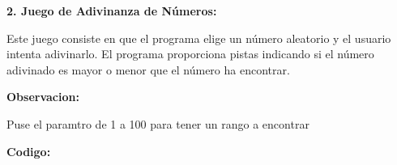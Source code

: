 \documentclass[a4paper]{article}
\begin{document}
\bigskip


\bigskip


\bigskip


\bigskip


\bigskip


\bigskip


\bigskip


\bigskip


\bigskip


\bigskip


\bigskip


\bigskip

{
\textbf{2. Juego de Adivinanza de Números:}}

{
Este juego consiste en que el programa elige un número aleatorio y el usuario intenta adivinarlo. El programa
proporciona pistas indicando si el número adivinado es mayor o menor que el número ha encontrar.}

{
\textbf{Observacion: }}

{
Puse el paramtro de 1 a 100 para tener un rango a encontrar}

{
\textbf{Codigo:}}


\bigskip


\bigskip



\begin{center}
\end{center}

\bigskip


\bigskip


\bigskip


\bigskip


\bigskip


\bigskip


\bigskip


\bigskip


\bigskip


\bigskip


\bigskip


\bigskip


\bigskip


\bigskip


\bigskip


\bigskip
\end{document}
